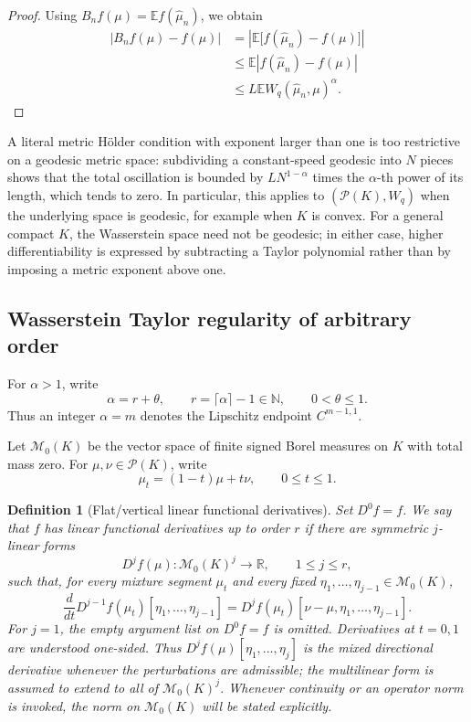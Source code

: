 \documentclass[11pt]{article}
\newtheorem{definition}{Definition}
\newcommand{\Pcal}{\mathcal P}
\newcommand{\Mcal}{\mathcal M}
\newcommand{\E}{\mathbb E}
\newcommand{\R}{\mathbb R}
\begin{document}
\begin{proof}
Using \(B_nf(\mu)=\E f(\widehat\mu_n)\), we obtain
\[
\begin{aligned}
|B_nf(\mu)-f(\mu)|
&=
\left|\E\bigl[f(\widehat\mu_n)-f(\mu)\bigr]\right|\\
&\leq
\E\left|f(\widehat\mu_n)-f(\mu)\right|\\
&\leq
L\E W_q(\widehat\mu_n,\mu)^\alpha.
\end{aligned}
\]
\end{proof}

A literal metric Hölder condition with exponent larger than one is too
restrictive on a geodesic metric space: subdividing a constant-speed
geodesic into \(N\) pieces shows that the total oscillation is bounded by
\(L N^{1-\alpha}\) times the \(\alpha\)-th power of its length, which
tends to zero. In particular, this applies to \((\Pcal(K),W_q)\) when
the underlying space is geodesic, for example when \(K\) is convex.
For a general compact \(K\), the Wasserstein space need not be geodesic;
in either case, higher differentiability is expressed by subtracting a
Taylor polynomial rather than by imposing a metric exponent above one.

\subsection{Wasserstein Taylor regularity of arbitrary order}
\label{sec:wasserstein-taylor}

For \(\alpha>1\), write
\[
\alpha=r+\theta,
\qquad
r=\lceil\alpha\rceil-1\in\mathbb N,
\qquad
0<\theta\leq 1.
\]
Thus an integer \(\alpha=m\) denotes the Lipschitz endpoint
\(C^{m-1,1}\).

Let \(\Mcal_0(K)\) be the vector space of finite signed Borel measures
on \(K\) with total mass zero. For \(\mu,\nu\in\Pcal(K)\), write
\[
\mu_t=(1-t)\mu+t\nu,
\qquad 0\leq t\leq1.
\]

\begin{definition}[Flat/vertical linear functional derivatives]
Set \(D^0f=f\). We say that \(f\) has linear functional derivatives up
to order \(r\) if there are symmetric \(j\)-linear forms
\[
D^jf(\mu):\Mcal_0(K)^j\longrightarrow\R,
\qquad 1\leq j\leq r,
\]
such that, for every mixture segment \(\mu_t\) and every fixed
\(\eta_1,\ldots,\eta_{j-1}\in\Mcal_0(K)\),
\[
\frac{d}{dt}
D^{j-1}f(\mu_t)[\eta_1,\ldots,\eta_{j-1}]
=
D^jf(\mu_t)
[\nu-\mu,\eta_1,\ldots,\eta_{j-1}].
\]
For \(j=1\), the empty argument list on \(D^0f=f\) is omitted.
Derivatives at \(t=0,1\) are understood one-sided. Thus
\(D^jf(\mu)[\eta_1,\ldots,\eta_j]\) is the mixed directional
derivative whenever the perturbations are admissible; the multilinear
form is assumed to extend to all of \(\Mcal_0(K)^j\).
Whenever continuity or an operator norm is invoked, the norm on
\(\Mcal_0(K)\) will be stated explicitly.
\end{definition}
\end{document}
